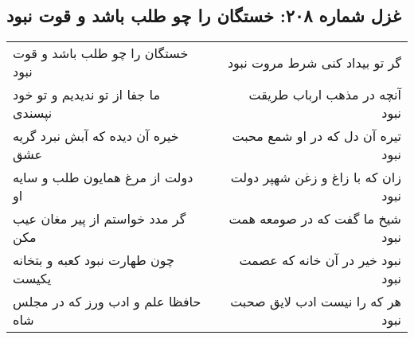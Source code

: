 \begin{center}
\section*{غزل شماره ۲۰۸: خستگان را چو طلب باشد و قوت نبود}
\label{sec:sh208}
\begin{longtable}{l p{0.5cm} r}
خستگان را چو طلب باشد و قوت نبود
&&
گر تو بیداد کنی شرط مروت نبود
\\
ما جفا از تو ندیدیم و تو خود نپسندی
&&
آنچه در مذهب ارباب طریقت نبود
\\
خیره آن دیده که آبش نبرد گریه عشق
&&
تیره آن دل که در او شمع محبت نبود
\\
دولت از مرغ همایون طلب و سایه او
&&
زان که با زاغ و زغن شهپر دولت نبود
\\
گر مدد خواستم از پیر مغان عیب مکن
&&
شیخ ما گفت که در صومعه همت نبود
\\
چون طهارت نبود کعبه و بتخانه یکیست
&&
نبود خیر در آن خانه که عصمت نبود
\\
حافظا علم و ادب ورز که در مجلس شاه
&&
هر که را نیست ادب لایق صحبت نبود
\\
\end{longtable}
\end{center}
